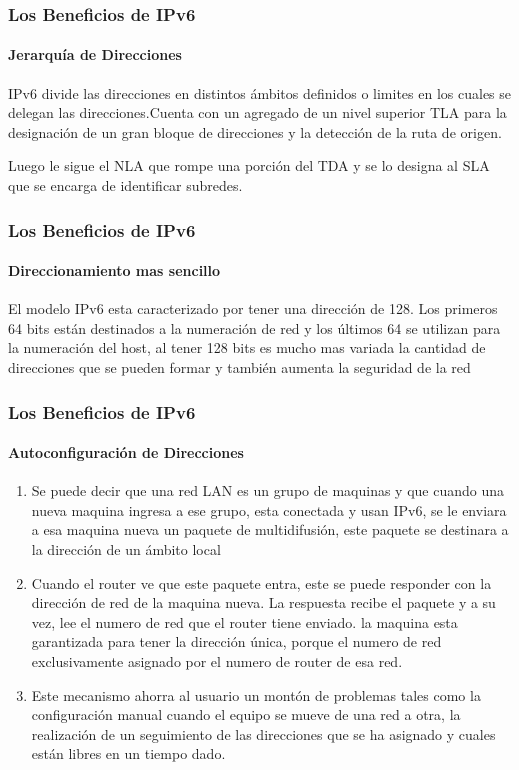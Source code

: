 \documentclass{beamer}
\begin{document}
\begin{frame}
\frametitle{Los Beneficios de IPv6}
\framesubtitle{Jerarquía de Direcciones}


IPv6 divide las direcciones en distintos ámbitos definidos o limites en los cuales se delegan las 
direcciones.Cuenta con un agregado de un nivel superior TLA para la designación de un gran bloque de direcciones y la detección de la ruta de origen.\par Luego le sigue el NLA que rompe una porción del TDA  y se lo designa al SLA que se encarga de identificar subredes.

\end{frame}

\begin{frame}
\frametitle{Los Beneficios de IPv6}
\framesubtitle{Direccionamiento mas sencillo}
El modelo IPv6 esta  caracterizado por tener una dirección de 128. Los primeros 64 bits están 
destinados a la numeración de red y los últimos 64 se utilizan para la numeración del host,
al tener 
128 bits es mucho mas variada la cantidad de direcciones que se pueden formar y también aumenta la 
seguridad de la red

\end{frame}

\begin{frame}
\frametitle{Los Beneficios de IPv6}
\framesubtitle{Autoconfiguración de Direcciones}

\begin{enumerate}[$*$]
	
 \item Se puede decir que una red LAN es un grupo de 
maquinas y que cuando una nueva maquina ingresa a ese grupo, esta conectada y usan IPv6, se le 
enviara a esa maquina nueva un paquete de multidifusión, este paquete se destinara a la dirección 
de un ámbito local
\item Cuando el router ve que este paquete entra, este se puede responder con la 
dirección de red de la maquina nueva. La respuesta recibe el paquete y a su vez, lee el numero de 
red que el router tiene enviado. la maquina esta garantizada para tener la dirección única, 
porque el numero de red exclusivamente asignado por el numero de router de esa red.
\item Este mecanismo ahorra al usuario un montón de problemas tales como la configuración manual cuando el 
equipo se mueve de una red a otra, la realización de un seguimiento de las direcciones que se ha 
asignado y cuales están libres en un tiempo dado.


\end{enumerate}

\end{frame}
\end{document}
